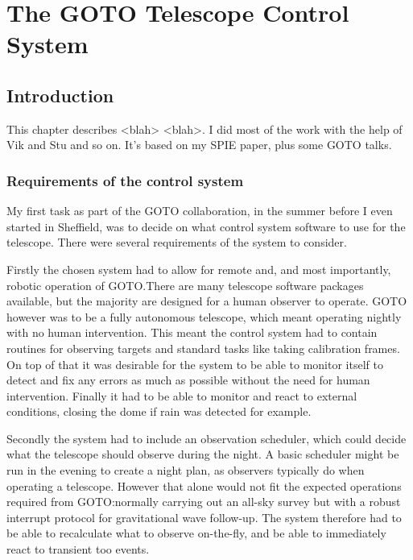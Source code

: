 \chapter{The GOTO Telescope Control System}
\label{chap:gtecs}
\chaptoc{}


\section{Introduction}
\label{sec:gtecs_intro}
\begin{colsection}


\begin{colsection}

This chapter describes <blah> <blah>.
I did most of the work with the help of Vik and Stu and so on.
It's based on my SPIE paper, plus some GOTO talks.

\end{colsection}


\subsection{Requirements of the control system}
\label{sec:control_desision}
\begin{colsection}

My first task as part of the GOTO collaboration, in the summer before I even started in Sheffield, was to decide on what control system software to use for the telescope. There were several requirements of the system to consider.

Firstly the chosen system had to allow for remote and, and most importantly, robotic operation of GOTO.\@ There are many telescope software packages available, but the majority are designed for a human observer to operate. GOTO however was to be a fully autonomous telescope, which meant operating nightly with no human intervention. This meant the control system had to contain routines for observing targets and standard tasks like taking calibration frames. On top of that it was desirable for the system to be able to monitor itself to detect and fix any errors as much as possible without the need for human intervention. Finally it had to be able to monitor and react to external conditions, closing the dome if rain was detected for example.

Secondly the system had to include an observation scheduler, which could decide what the telescope should observe during the night. A basic scheduler might be run in the evening to create a night plan, as observers typically do when operating a telescope. However that alone would not fit the expected operations required from GOTO:\@ normally carrying out an all-sky survey but with a robust interrupt protocol for gravitational wave follow-up. The system therefore had to be able to recalculate what to observe on-the-fly, and be able to immediately react to transient \gls{too} events.


\end{colsection}
\end{colsection}
